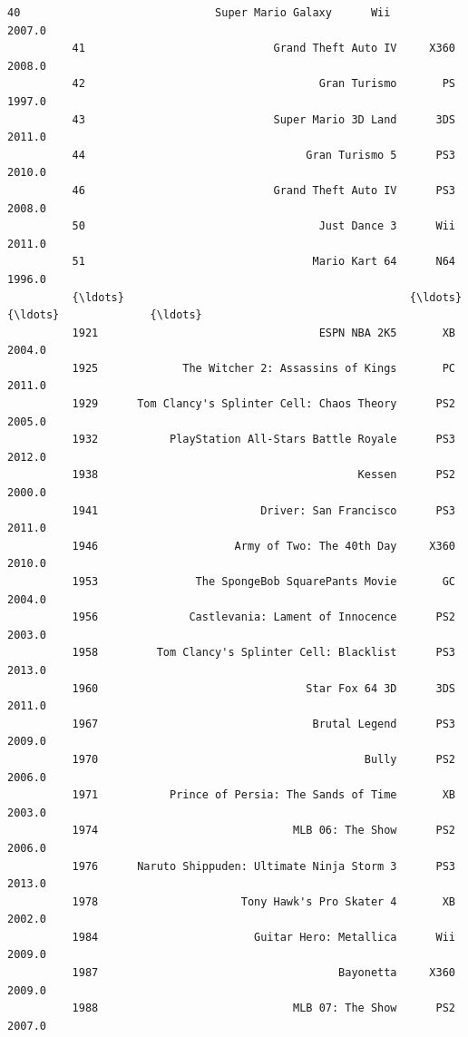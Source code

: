 \documentclass[11pt]{article}
\begin{document}
\begin{Verbatim}[commandchars=\\\{\}]
          40                              Super Mario Galaxy      Wii           2007.0   
          41                             Grand Theft Auto IV     X360           2008.0   
          42                                    Gran Turismo       PS           1997.0   
          43                             Super Mario 3D Land      3DS           2011.0   
          44                                  Gran Turismo 5      PS3           2010.0   
          46                             Grand Theft Auto IV      PS3           2008.0   
          50                                    Just Dance 3      Wii           2011.0   
          51                                   Mario Kart 64      N64           1996.0   
          {\ldots}                                            {\ldots}      {\ldots}              {\ldots}   
          1921                                  ESPN NBA 2K5       XB           2004.0   
          1925             The Witcher 2: Assassins of Kings       PC           2011.0   
          1929      Tom Clancy's Splinter Cell: Chaos Theory      PS2           2005.0   
          1932           PlayStation All-Stars Battle Royale      PS3           2012.0   
          1938                                        Kessen      PS2           2000.0   
          1941                         Driver: San Francisco      PS3           2011.0   
          1946                     Army of Two: The 40th Day     X360           2010.0   
          1953               The SpongeBob SquarePants Movie       GC           2004.0   
          1956              Castlevania: Lament of Innocence      PS2           2003.0   
          1958         Tom Clancy's Splinter Cell: Blacklist      PS3           2013.0   
          1960                                Star Fox 64 3D      3DS           2011.0   
          1967                                 Brutal Legend      PS3           2009.0   
          1970                                         Bully      PS2           2006.0   
          1971           Prince of Persia: The Sands of Time       XB           2003.0   
          1974                              MLB 06: The Show      PS2           2006.0   
          1976      Naruto Shippuden: Ultimate Ninja Storm 3      PS3           2013.0   
          1978                      Tony Hawk's Pro Skater 4       XB           2002.0   
          1984                        Guitar Hero: Metallica      Wii           2009.0   
          1987                                     Bayonetta     X360           2009.0   
          1988                              MLB 07: The Show      PS2           2007.0   

\end{Verbatim}
\end{document}
